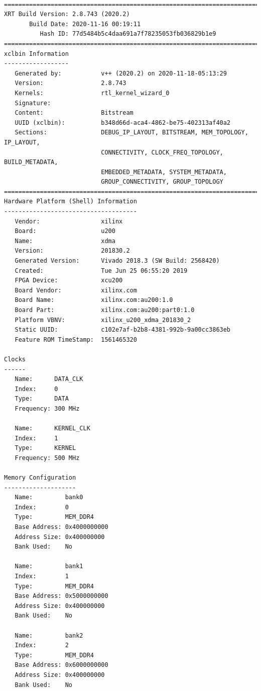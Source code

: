 \begin{lstlisting}[label=code, basicstyle=\tiny, caption=Листинг файла vinc.xclbin.info]

==============================================================================
XRT Build Version: 2.8.743 (2020.2)
       Build Date: 2020-11-16 00:19:11
          Hash ID: 77d5484b5c4daa691a7f78235053fb036829b1e9
==============================================================================
xclbin Information
------------------
   Generated by:           v++ (2020.2) on 2020-11-18-05:13:29
   Version:                2.8.743
   Kernels:                rtl_kernel_wizard_0
   Signature:              
   Content:                Bitstream
   UUID (xclbin):          b348d66d-aca4-4862-be75-402313af40a2
   Sections:               DEBUG_IP_LAYOUT, BITSTREAM, MEM_TOPOLOGY, IP_LAYOUT, 
                           CONNECTIVITY, CLOCK_FREQ_TOPOLOGY, BUILD_METADATA, 
                           EMBEDDED_METADATA, SYSTEM_METADATA, 
                           GROUP_CONNECTIVITY, GROUP_TOPOLOGY
==============================================================================
Hardware Platform (Shell) Information
-------------------------------------
   Vendor:                 xilinx
   Board:                  u200
   Name:                   xdma
   Version:                201830.2
   Generated Version:      Vivado 2018.3 (SW Build: 2568420)
   Created:                Tue Jun 25 06:55:20 2019
   FPGA Device:            xcu200
   Board Vendor:           xilinx.com
   Board Name:             xilinx.com:au200:1.0
   Board Part:             xilinx.com:au200:part0:1.0
   Platform VBNV:          xilinx_u200_xdma_201830_2
   Static UUID:            c102e7af-b2b8-4381-992b-9a00cc3863eb
   Feature ROM TimeStamp:  1561465320

Clocks
------
   Name:      DATA_CLK
   Index:     0
   Type:      DATA
   Frequency: 300 MHz

   Name:      KERNEL_CLK
   Index:     1
   Type:      KERNEL
   Frequency: 500 MHz

Memory Configuration
--------------------
   Name:         bank0
   Index:        0
   Type:         MEM_DDR4
   Base Address: 0x4000000000
   Address Size: 0x400000000
   Bank Used:    No

   Name:         bank1
   Index:        1
   Type:         MEM_DDR4
   Base Address: 0x5000000000
   Address Size: 0x400000000
   Bank Used:    No

   Name:         bank2
   Index:        2
   Type:         MEM_DDR4
   Base Address: 0x6000000000
   Address Size: 0x400000000
   Bank Used:    No


\end{lstlisting}
